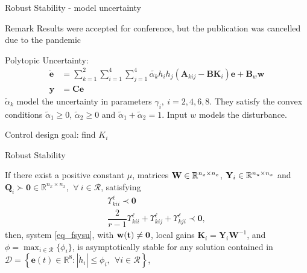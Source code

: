 \begin{frame}{Robust Stability - model uncertainty}
\begin{block}{Remark}
Results were accepted for conference, but the publication was cancelled due to the pandemic
\end{block}
Polytopic Uncertainty:
\begin{align}
\label{eq_fsysu}
\mathbf{\dot e} &= \sum_{k=1}^{2}\sum_{i=1}^{4}\sum_{j=1}^{4}\tilde{\alpha_k}h_ih_j(\mathbf{A}_{kij}-\mathbf{B}\mathbf{K}_i)\mathbf{e}+\mathbf{B}_{w}{\mathbf w}\\
\mathbf{y}&=\mathbf{C e}
\end{align}
${\tilde \alpha_k}$ model the uncertainty in parameters $\gamma_i, ~i=2,4,6,8$.  They satisfy the convex conditions ${\tilde \alpha_1}\geq 0$, ${\tilde \alpha_2}\geq 0$ and ${\tilde \alpha_1}+{\tilde \alpha_2}=1$. Input $w$ models the disturbance.
\begin{block}{}
Control design goal: find $K_i$
\end{block}
\end{frame}

\begin{frame}{Robust Stability} 
\begin{theorem}
If there exist a positive constant $\mu$, matrices ${\bf W} \in \mathbb{R}^{n_x\times n_x}$, ${\bf Y}_{i} \in \mathbb{R}^{n_u\times n_x}$ and $\mathbf{Q}_{i} \succ \mathbf{0} \in \mathbb{R}^{n_x\times n_x}$, $ ~\forall ~i \in \mathcal{R}$, satisfying
\begin{align}
\label{eq_lmis_teo}
\Upsilon^{\ell}_{kii}\prec \mathbf{0}
\\[2mm]
\dfrac{2}{r-1}\Upsilon^{\ell}_{kii}+\Upsilon^{\ell}_{kij}+\Upsilon^{\ell}_{kji}\prec \mathbf{0},
\end{align}
then, system \eqref{eq_fsysu}, with $\bf{w}(t)\neq \mathbf{0}$, local gains $\mathbf{K}_{i}=\mathbf{Y}_{i}\mathbf W^{-1}$, and $\displaystyle \phi=\max_{i \in \mathcal{R}} \{\phi_i\}$, is asymptotically stable for any solution contained in $\mathcal{D}=\left\{\mathbf{e}(t)\in \mathbb{R}^8:|\dot{h}_{i}|\leq \phi_{i},~~\forall i\in \mathcal{R}\right\}$,
\end{theorem}
\end{frame}

